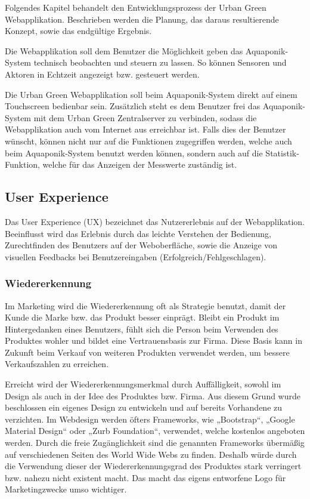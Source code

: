 \setcounter{page}{91}
Folgendes Kapitel behandelt den Entwicklungsprozess der Urban Green Webapplikation. Beschrieben werden die Planung, das daraus resultierende Konzept, sowie das endgültige Ergebnis.

Die Webapplikation soll dem Benutzer die Möglichkeit geben das Aquaponik-System technisch beobachten und steuern zu lassen. So können Sensoren und Aktoren in Echtzeit angezeigt bzw. gesteuert werden.

Die Urban Green Webapplikation soll beim Aquaponik-System direkt auf einem Touchscreen bedienbar sein. Zusätzlich steht es dem Benutzer frei das Aquaponik-System mit dem Urban Green Zentralserver zu verbinden, sodass die Webapplikation auch vom Internet aus erreichbar ist. Falls dies der Benutzer wünscht, können nicht nur auf die Funktionen zugegriffen werden, welche auch beim Aquaponik-System benutzt werden können, sondern auch auf die Statistik-Funktion, welche für das Anzeigen der Messwerte zuständig ist.

\subsection{User Experience}
\label{sec:ux}
Das User Experience (UX) bezeichnet das Nutzererlebnis auf der Webapplikation. Beeinflusst wird das Erlebnis durch das leichte Verstehen der Bedienung, Zurechtfinden des Benutzers auf der Weboberfläche, sowie die Anzeige von visuellen Feedbacks bei Benutzereingaben (Erfolgreich/Fehlgeschlagen).

\subsubsection{Wiedererkennung}
Im Marketing wird die Wiedererkennung oft als Strategie benutzt, damit der Kunde die Marke bzw. das Produkt besser einprägt. Bleibt ein Produkt im Hintergedanken eines Benutzers, fühlt sich die Person beim Verwenden des Produktes wohler und bildet eine Vertrauensbasis zur Firma. \cite{wiedererkennung} Diese Basis kann in Zukunft beim Verkauf von weiteren Produkten verwendet werden, um bessere Verkaufszahlen zu erreichen.

Erreicht wird der Wiedererkennungsmerkmal durch Auffälligkeit, sowohl im Design als auch in der Idee des Produktes bzw. Firma. Aus diesem Grund wurde beschlossen ein eigenes Design zu entwickeln und auf bereits Vorhandene zu verzichten. Im Webdesign werden öfters Frameworks, wie „Bootstrap“, „Google Material Design“ oder „Zurb Foundation“, verwendet, welche kostenlos angeboten werden. Durch die freie Zugänglichkeit sind die genannten Frameworks übermäßig auf verschiedenen Seiten des World Wide Webs zu finden. Deshalb würde durch die Verwendung dieser der Wiedererkennungsgrad des Produktes stark verringert bzw. nahezu nicht existent macht. Das macht das eigens entworfene Logo für Marketingzwecke umso wichtiger.

